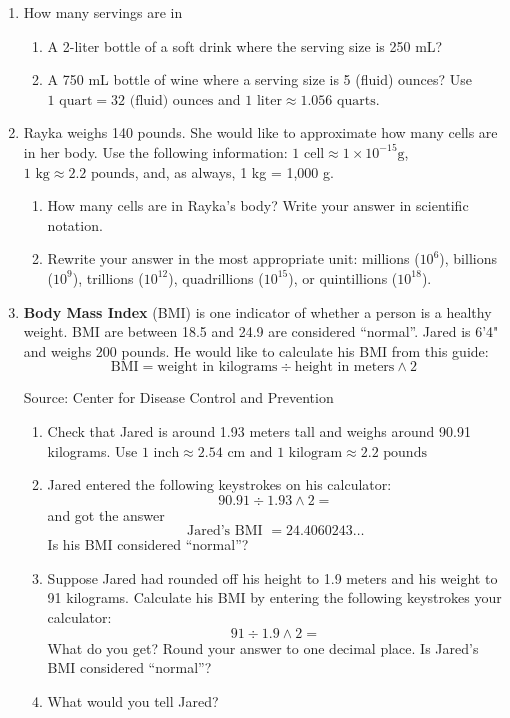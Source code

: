 \begin{enumerate}
\item How many servings are in 
\begin{enumerate}
\item A 2-liter bottle of a soft drink where the serving size is 250 mL?
\item A 750 mL bottle of wine where a serving size is 5 (fluid) ounces?  Use $1 \text{ quart} = 32 \text{ (fluid) ounces}$ and $1 \text{ liter} \approx 1.056 \text{ quarts}$.
\end{enumerate}

\item  Rayka weighs 140 pounds. She would like to approximate how many cells are in her body.  Use the following information: $1 \text{ cell} \approx 1 \times 10^{-15} \text{g}$, $1 \text{ kg} \approx \text{2.2 pounds} $, and, as always, 1 kg = 1,000 g.
\begin{enumerate}
\item How many cells are in Rayka's body?  Write your answer in scientific notation.
\item Rewrite your answer in the most appropriate unit:  millions ($10^6$), billions ($10^9$), trillions ($10^{12}$), quadrillions ($10^{15}$), or quintillions ($10^{18}$).
\end{enumerate}

\item  \textbf{Body Mass Index} (BMI) is one indicator of whether a person is a healthy weight.  BMI are between 18.5 and 24.9 are considered ``normal''.  Jared is 6'4" and weighs 200 pounds.  He would like to calculate his BMI from this guide:
$$\text{BMI} = \text{weight in kilograms} \div \text{height in meters} \wedge 2$$
\hfill \begin{footnotesize} Source:  Center for Disease Control and Prevention  \end{footnotesize}
\begin{enumerate}
\item Check that Jared is around 1.93 meters tall and weighs around 90.91 kilograms.  Use $1 \text{ inch} \approx 2.54 \text{ cm}$ and $1 \text{ kilogram} \approx 2.2 \text{ pounds}$
\item Jared entered the following keystrokes on his calculator: $$90.91 \div 1.93 \wedge 2=$$
and got the answer $$\text{Jared's BMI } = 24.4060243\ldots$$ Is his BMI considered ``normal''?
\item Suppose Jared had rounded off his height to 1.9 meters and his weight to 91 kilograms.  Calculate his BMI by entering the following keystrokes your calculator:  $$91 \div 1.9 \wedge 2=$$
What do you get?  Round your answer to one decimal place.  Is Jared's BMI considered ``normal''?
\item What would you tell Jared?
\end{enumerate}






\end{enumerate}




